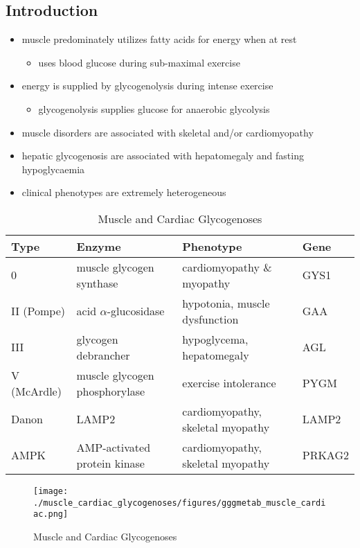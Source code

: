 \documentclass{scrartcl}
\begin{document}
\subsection{Introduction}
\label{sec:org91a467f}
\begin{itemize}
\item muscle predominately utilizes fatty acids for energy when at rest
\begin{itemize}
\item uses blood glucose during sub-maximal exercise
\end{itemize}
\item energy is supplied by glycogenolysis during intense exercise
\begin{itemize}
\item glycogenolysis supplies glucose for anaerobic glycolysis
\end{itemize}
\item muscle disorders are associated with skeletal and/or
cardiomyopathy
\item hepatic glycogenosis are associated with hepatomegaly and fasting
hypoglycaemia
\item clinical phenotypes are extremely heterogeneous
\end{itemize}

\begin{table}[htbp]
\caption{\label{tab:org5058052}
Muscle and Cardiac Glycogenoses}
\centering
\begin{tabular}{llll}
Type & Enzyme & Phenotype & Gene\\
\hline
0 & muscle glycogen synthase & cardiomyopathy \& myopathy & GYS1\\
II (Pompe) & acid \(\alpha\)-glucosidase & hypotonia, muscle dysfunction & GAA\\
III & glycogen debrancher & hypoglycema, hepatomegaly & AGL\\
V (McArdle) & muscle glycogen phosphorylase & exercise intolerance & PYGM\\
Danon & LAMP2 & cardiomyopathy, \textpm{} skeletal myopathy & LAMP2\\
AMPK & AMP-activated protein kinase & cardiomyopathy, \textpm{} skeletal myopathy & PRKAG2\\
\end{tabular}
\end{table}

\begin{figure}[htbp]
\centering
\texttt{[image: ./muscle\_cardiac\_glycogenoses/figures/gggmetab\_muscle\_cardiac.png]}
\caption[Muscle and Cardiac Glycogenoses]{\label{fig:orgc77d4d6}
Muscle and Cardiac Glycogenoses}
\end{figure}
\end{document}
